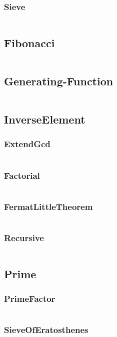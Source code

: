 \documentclass[a4paper,11pt]{article}
\begin{document}
\subsubsection{Sieve}
\inputminted[breaklines]{c++}{02++Math/+Euler/+Sieve.cpp}

\subsection{Fibonacci}
\inputminted[breaklines]{c++}{02++Math/+Fibonacci.cpp}
\subsection{Generating-Function}
\inputminted[breaklines]{c++}{02++Math/+Generating-Function.cpp}
\subsection{InverseElement}
\subsubsection{ExtendGcd}
\inputminted[breaklines]{c++}{02++Math/+InverseElement/+ExtendGcd.cpp}
\subsubsection{Factorial}
\inputminted[breaklines]{c++}{02++Math/+InverseElement/+Factorial.cpp}
\subsubsection{FermatLittleTheorem}
\inputminted[breaklines]{c++}{02++Math/+InverseElement/+FermatLittleTheorem.cpp}
\subsubsection{Recursive}
\inputminted[breaklines]{c++}{02++Math/+InverseElement/+Recursive.cpp}

\subsection{Prime}
\subsubsection{PrimeFactor}
\inputminted[breaklines]{c++}{02++Math/+Prime/+PrimeFactor.cpp}
\subsubsection{SieveOfEratosthenes}
\inputminted[breaklines]{c++}{02++Math/+Prime/+SieveOfEratosthenes.cpp}
\end{document}
